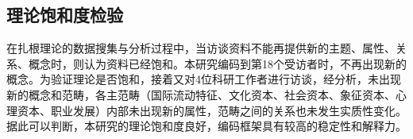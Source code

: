 
\subsection{理论饱和度检验}

在扎根理论的数据搜集与分析过程中，当访谈资料不能再提供新的主题、属性、关系、概念时，则认为资料已经饱和\cite{yangliping2022}。本研究编码到第18个受访者时，不再出现新的概念。为验证理论是否饱和，接着又对4位科研工作者进行访谈，经分析，未出现新的概念和范畴，各主范畴（国际流动特征、文化资本、社会资本、象征资本、心理资本、职业发展）内部未出现新的属性，范畴之间的关系也未发生实质性变化。据此可以判断，本研究的理论饱和度良好，编码框架具有较高的稳定性和解释力。
